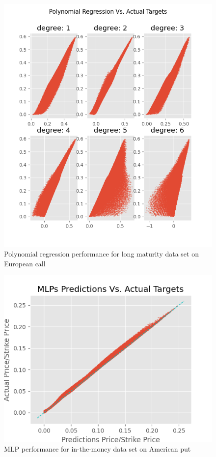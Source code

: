 \begin{figure}[th]
\centering
\includegraphics{Figures/polynomialLongTEuroC.png}
\decoRule
\caption[Polynomial Regression Performance for Long Maturity Data Set European Call]{Polynomial regression performance for long maturity data set on European call}
\label{fig:MLPsEuroCLongMaturity}
\end{figure}


\begin{figure}[th]
\centering
\includegraphics{Figures/outMoneyAmerP.png}
\decoRule
\caption[MLP Performance for In-the-Money Data Set American Put]{MLP performance for in-the-money data set on American put}
\label{fig:MLPsAmerPOutMoney}
\end{figure}

